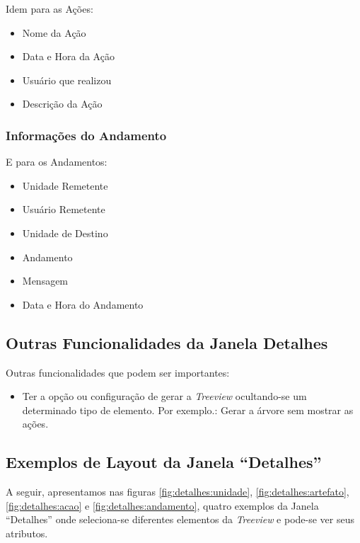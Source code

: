 	Idem para as Ações:
	
		\begin{itemize}
			\item Nome da Ação
			\item Data e Hora da Ação
			\item Usuário que realizou
			\item Descrição da Ação
		\end{itemize}
	
	\subsubsection{Informações do Andamento \msAnd}	
	
	E para os Andamentos:
	
		\begin{itemize}
			\item Unidade Remetente
			\item Usuário Remetente
			\item Unidade de Destino
			\item Andamento
			\item Mensagem
			\item Data e Hora do Andamento
		\end{itemize}
	
	\subsection{Outras Funcionalidades da Janela Detalhes}
	
	Outras funcionalidades que podem ser importantes:
	
	\begin{itemize}
		\item Ter a opção ou configuração de gerar a \emph{Treeview} ocultando-se um determinado tipo de elemento. Por exemplo.: Gerar a árvore sem mostrar as ações.				
	\end{itemize}
	
	\subsection{Exemplos de Layout da Janela ``Detalhes''}	
	

	A seguir, apresentamos nas figuras \ref{fig:detalhes:unidade}, \ref{fig:detalhes:artefato}, \ref{fig:detalhes:acao} e \ref{fig:detalhes:andamento}, quatro exemplos da Janela ``Detalhes'' onde seleciona-se diferentes elementos da \emph{Treeview} e pode-se ver seus atributos. 
	
